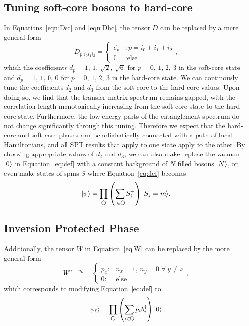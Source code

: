 \subsection{Tuning soft-core bosons to hard-core}
In Equations~\eqref{eqn:Dsc} and \eqref{eqn:Dhc}, the tensor $D$ can be replaced by a more general form 
\begin{equation} \label{eqn:Dgen}
D_{p, i_0 i_1 i_2}  = \left\{ \begin{array}{ll}
													d_p  &: p =i_0+i_1+i_2  \\
													0  &:  \text{else}
													\end{array}
											\right. ,
\end{equation}
which the coefficients $d_p = 1,\, 1,\, \sqrt{2},\,\sqrt{6}$ for $p = 0,\, 1,\, 2,\, 3$ in the soft-core state and $d_p = 1,\, 1,\, 0,\, 0$ for $p = 0,\, 1,\, 2,\, 3$ in the hard-core state. We can continously tune the coefficients $d_2$ and $d_3$ from the soft-core to the hard-core values.
Upon doing so, we find that the transfer matrix spectrum remains gapped, with the correlation length monotonically increasing from the soft-core state to the hard-core state. 
Furthermore, the low energy parts of the entanglement spectrum do not change significantly through this tuning.
Therefore we expect that the hard-core and soft-core phases can be adiabatically connected with a 
path of local Hamiltonians, and all SPT results that apply to one state apply to the other. By choosing appropriate values of $d_2$ and $d_3$, we can also make replace the vacuum $\vert 0 \rangle$ in
Equation~\eqref{eq:def} with a constant background of $N$ filled bosons $\vert N \rangle$, or even make
states of spins $S$ where Equation~\eqref{eq:def} becomes
\begin{equation} \label{eq:spindef}
\ket{\psi} = \prod\limits_{\varhexagon} \left( \sum\limits_{i \in \varhexagon} S^{+}_{i} \right) \ket{S_z = m}.
\end{equation}

\subsection{Inversion Protected Phase}
Additionally, the tensor $W$ in Equation~\eqref{eq:W} can be replaced by the more general form
\begin{equation} \label{eq:Wgen}
W^{n_1 \ldots n_6}  = \left\{ \begin{array}{lr}
													p_x  : & n_x=1,\, n_y = 0
													\; \forall \; y \neq x \\
													0  : & \text{else}
													\end{array} \right.,
\end{equation}
which corresponds to modifying Equation~\eqref{eq:def} to 
\begin{equation} \label{eq:pdef}
\ket{\psi_{\ell}} = \prod\limits_{\varhexagon} \left( \sum\limits_{i \in \varhexagon} p_i b^{\dagger}_{i} \right) \ket{0}.
\end{equation}

